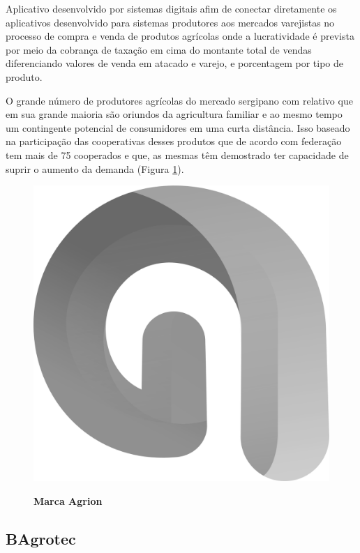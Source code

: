 Aplicativo desenvolvido por sistemas digitais afim de conectar diretamente os aplicativos desenvolvido para sistemas produtores aos mercados varejistas no processo de compra e venda de produtos agrícolas onde a lucratividade é prevista por meio da cobrança de taxação em cima do montante total de vendas diferenciando valores de venda em atacado e varejo, e porcentagem por tipo de produto.

O grande número de produtores agrícolas  do mercado sergipano com relativo que  em sua grande maioria são oriundos da agricultura familiar e ao mesmo tempo um contingente potencial de consumidores em uma curta distância. Isso baseado na  participação das cooperativas desses produtos que de acordo 
com federação tem mais de 75 cooperados e que, as mesmas têm demostrado ter capacidade de suprir o aumento da demanda (Figura \ref{figura_14}).


\begin{figure}[H]
\centering
\caption{\textbf{Marca Agrion}}
\includegraphics[scale=0.2]{Imagens/agrion.png}
\label{figura_14}
\end{figure}

\subsection{BAgrotec}

